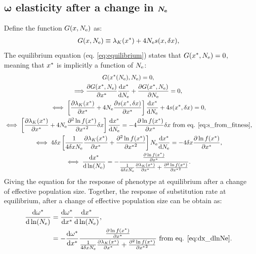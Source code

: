 \documentclass{article}
\begin{document}
\subsection{$\bm{\omega}$ elasticity after a change in $\bm{N_{\mathrm{e}}}$}
Define the function $G(x, N_{\mathrm{e}} )$ as:
\begin{gather}
G(x, N_{\mathrm{e}} ) \equiv \lambda_K (x^{*}) + 4 N_{\mathrm{e}} s(x, \delta x), 
\end{gather}
The equilibrium equation (eq. \ref{eq:equilibrium}) states that $G(x^{*}, N_{\mathrm{e}} )=0$, meaning that $x^{*}$ is implicitly a function of $N_{\mathrm{e}}$:
\begin{gather}
G(x^{*}(N_{\mathrm{e}}), N_{\mathrm{e}} ) = 0, \\
\Longrightarrow \frac{\partial G(x^{*}, N_{\mathrm{e}} ) }{\partial x^{*} }\frac{ \mathrm{d} x^{*}}{\mathrm{d} N_{\mathrm{e}}} + \frac{ \partial G(x^{*}, N_{\mathrm{e}} )}{\partial N_{\mathrm{e}}} = 0, \\
\iff \left[  \frac{\partial \lambda_K (x^{*}) }{\partial x^{*} }  + 4 N_{\mathrm{e}} \frac{ \partial s(x^{*}, \delta x) }{\partial x^{*} } \right]\frac{ \mathrm{d} x^{*}}{\mathrm{d} N_{\mathrm{e}}} + 4 s(x^{*}, \delta x) = 0, \\
\iff \left[  \frac{\partial \lambda_K (x^{*}) }{\partial x^{*} } + 4 N_{\mathrm{e}} \frac{ \partial^2 \ln f(x^{*}) }{\partial {x^{*}}^2}\delta x \right]\frac{ \mathrm{d} x^{*}}{\mathrm{d} N_{\mathrm{e}}}  = - 4 \frac{ \partial \ln f(x^{*}) }{\partial {x^{*}}}\delta x \text{ from eq. \ref{eq:s_from_fitness}}, \\
\iff 4 \delta x \left[ \frac{1}{4 \delta x N_{\mathrm{e}} } \frac{\partial \lambda_K (x^{*}) }{\partial x^{*} } + \frac{ \partial^2 \ln f(x^{*}) }{\partial {x^{*}}^2} \right] N_{\mathrm{e}} \frac{ \mathrm{d} x^{*}}{\mathrm{d} N_{\mathrm{e}}}  = - 4 \delta x \frac{ \partial \ln f(x^{*}) }{\partial {x^{*}}}, \\
\iff \frac{ \mathrm{d} x^{*}}{\mathrm{d} \ln (N_{\mathrm{e}})}  = - \frac{\frac{ \partial \ln f(x^{*}) }{\partial {x^{*}}}}{\frac{1}{4 \delta x N_{\mathrm{e}}} \frac{\partial \lambda_K (x^{*}) }{\partial x^{*} } + \frac{ \partial^2 \ln f(x^{*}) }{\partial {x^{*}}^2}}  \label{eq:dx_dlnNe}.
\end{gather}
Giving the equation for the response of phenotype at equilibrium after a change of effective population size.
Together, the response of substitution rate at equilibrium, after a change of effective population size can be obtain as:
\begin{align}
\frac{\mathrm{d} \omega^{*}}{\mathrm{d} \ln (N_{\mathrm{e}})} & = \frac{\mathrm{d} \omega^{*}}{\mathrm{d} x^{*}} \frac{ \mathrm{d} x^{*}}{\mathrm{d} \ln (N_{\mathrm{e}})}, \\
 &= - \frac{\mathrm{d} \omega^{*}}{\mathrm{d} x^{*}} \frac{\frac{ \partial \ln f(x^{*}) }{\partial {x^{*}}}}{\frac{1}{4 \delta x N_{\mathrm{e}} } \frac{\partial \lambda_K (x^{*}) }{\partial x^{*} } + \frac{ \partial^2 \ln f(x^{*}) }{\partial {x^{*}}^2}} \text{ from eq. \ref{eq:dx_dlnNe}} \label{eq:dw_dlnNe}.
\end{align}
\end{document}

